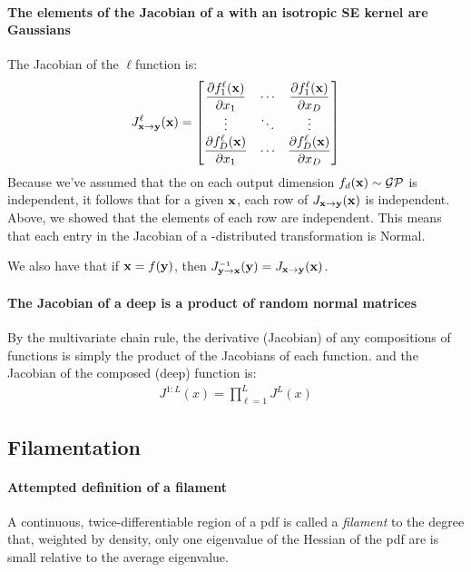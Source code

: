 \documentclass{article}
\newcommand{\fdeep}{f^{1:L}}
\newcommand{\Jx}{J_{\vx \rightarrow \vy}}
\newcommand{\Jxx}{J_{\vx \rightarrow \vy}(\vx)}
\newcommand{\Jy}{J_{\vy \rightarrow \vx}}
\begin{document}
\paragraph{The elements of the Jacobian of a \gp{} with an isotropic SE kernel are \iid Gaussians}

The Jacobian of the $\ell$\asdf function is:
%
\begin{align}
\Jx^\ell(\vx) =\begin{bmatrix} \dfrac{\partial f^\ell_1 (\vx) }{\partial x_1} & \cdots & \dfrac{\partial f^\ell_1 (\vx)}{\partial x_D} \\ \vdots & \ddots & \vdots \\ \dfrac{\partial f^\ell_D (\vx)}{\partial x_1} & \cdots & \dfrac{\partial f^\ell_D (\vx)}{\partial x_D}  \end{bmatrix}
\end{align}
%
Because we've assumed that the \gp{} on each output dimension $f_d({\bf{x}}) \sim \mathcal{GP}$ is independent, it follows that for a given ${\bf{x}}$, each row of $\Jxx$ is independent.
Above, we showed that the elements of each row are independent.
This means that each entry in the Jacobian of a \gp{}-distributed transformation is \iid Normal.

We also have that if ${\bf{x}} = f({\bf{y}})$, then $\Jy\inv(\vy) = \Jxx$.

\paragraph{The Jacobian of a deep \gp{} is a product of random normal matrices}
By the multivariate chain rule, the derivative (Jacobian) of any compositions of functions is simply the product of the Jacobians of each function.  
%
and the Jacobian of the composed (deep) function is:
%
\begin{align}
J^{1:L}(x) 
= \prod_{\ell = 1}^{L} J^L (x)
\end{align}

\subsection{Filamentation}

\paragraph{Attempted definition of a filament}  A continuous, twice-differentiable region of a pdf is called a \emph{filament} to the degree that, weighted by density, only one eigenvalue of the Hessian of the pdf are is small relative to the average eigenvalue.
\end{document}
